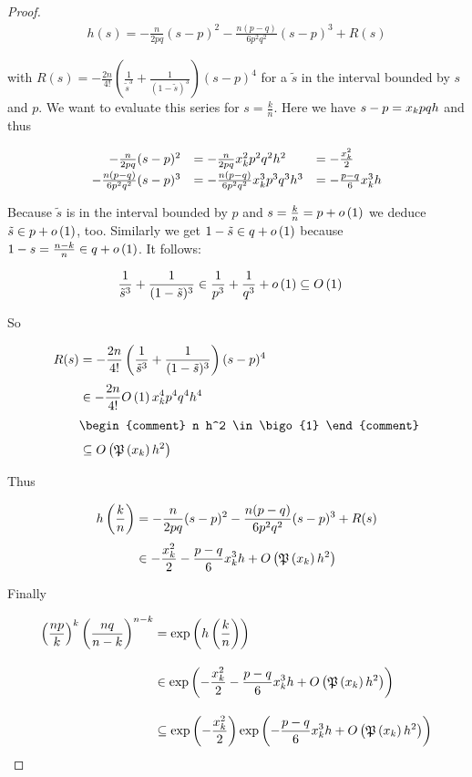 \begin{proof}
  \begin{align}
    h(s) = -\frac{n}{2pq} (s-p)^2 - \frac{n(p-q)}{6p^2q^2} (s-p)^3 + R(s)
  \end{align}

  with $R(s)=-\frac{2n}{4!} \left(\frac{1}{\tilde s^3}+\frac{1}{(1-\tilde s)^3}\right) (s-p)^4$ for a $\tilde s$ in the interval bounded by $s$ and $p$. We want to evaluate this series for $s=\frac kn$. Here we have $s-p=x_{k} pqh$ and thus

  \begin{align}
    \begin{array}{rll}
      -\frac{n}{2pq} (s-p)^2 &= -\frac{n}{2pq} \x^2 p^2 q^2 h^2 & = -\frac{\x^2}{2} \nl
      -\frac{n(p-q)}{6p^2q^2} (s-p)^3 &= -\frac{n(p-q)}{6p^2q^2} \x^3p^3q^3h^3 & = -\frac{p-q}{6} \x^3 h
    \end{array}
  \end{align}

  Because $\tilde s$ is in the interval bounded by $p$ and $s=\frac kn = p + o\left( {1} \right)$ we deduce $\tilde s \in p + o\left( {1} \right)$, too. Similarly we get $1-\tilde s\in q+o\left( {1} \right)$ because $1-s = \frac{n-k}{n} \in q+o\left( {1} \right)$. It follows:

  \begin{align}
    \frac 1{\tilde s^3} + \frac 1{(1-\tilde s)^3} & \in \frac1{p^3} + \frac{1}{q^3} + o\left( {1} \right) \subseteq O\left( {1} \right)
  \end{align}

  \noindent So

  \begin{align}
    R(s) & = -\frac{2n}{4!} \left(\frac 1{\tilde s^3} + \frac 1{(1-\tilde s)^3}\right) (s-p)^4 \nl
    & \in -\frac{2n}{4!} \bigo{1} \x^4 p^4 q^4 h^4 \nl
    &
    \begin{comment}
      n h^2 \in \bigo{1}
    \end{comment} \nl
    & \subseteq \bigo{\pol{\x} h^2}
  \end{align}

  \noindent Thus

  \begin{align}
    \h{\frac kn} &=-\frac{n}{2pq} (s-p)^2 - \frac{n(p-q)}{6p^2q^2} (s-p)^3 + R(s) \nl
    & \in -\frac{\x^2}{2} - \frac{p-q}{6} \x^3 h + \bigo{\pol{\x} h^2}
  \end{align}

  \noindent Finally

  \begin{align}
    \left(\frac{np}{k}\right)^k \left(\frac{nq}{n-k}\right)^{n-k} & = \fexp{\h{\frac kn}} \bnl
    & \in \fexp{-\frac{\x^2}{2} - \frac{p-q}{6} \x^3 h + \bigo{\pol{\x} h^2}} \bnl
    & \subseteq \fexp{-\frac{\x^2}{2}} \fexp{-\frac{p-q}6 \x^3 h + \bigo{\pol{\x} h^2}}
  \end{align}


\end{proof}
